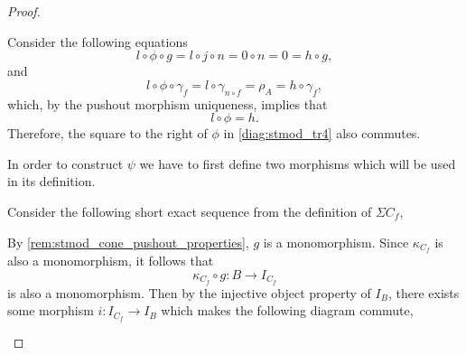 \begin{proof}
\begin{enumerate}[label={(\bfseries TR\arabic*)}]
{\begin{center}
            \end{center}
            Consider the following equations
            \[
                l \circ \phi \circ g = l \circ j \circ n = 0 \circ n = 0 = h \circ g,
            \]
            and
            \[
                l \circ \phi \circ \gamma_f = l \circ \gamma_{n \circ f} = \rho_A = h \circ \gamma_f,
            \]
            which, by the pushout morphism uniqueness, implies that
            \[
                l \circ \phi = h.
            \]
            Therefore, the square to the right of \( \phi \) in \autoref{diag:stmod_tr4} also commutes.

            In order to construct \( \psi \) we have to first define two morphisms which will be used in its definition.

            Consider the following short exact sequence from the definition of \( \Sigma C_f \),
            \begin{center}
            \end{center}

            By \autoref{rem:stmod_cone_pushout_properties}, \( g \) is a monomorphism. Since \( \kappa_{C_f} \) is also a monomorphism, it follows that
            \[
                \kappa_{C_f} \circ g: B \to I_{C_f}
            \]
            is also a monomorphism. Then by the injective object property of \( I_B \), there exists some morphism \( i: I_{C_f} \to I_B \) which makes the following diagram commute,
            \begin{center}
\end{center}}
\end{enumerate}
\end{proof}
